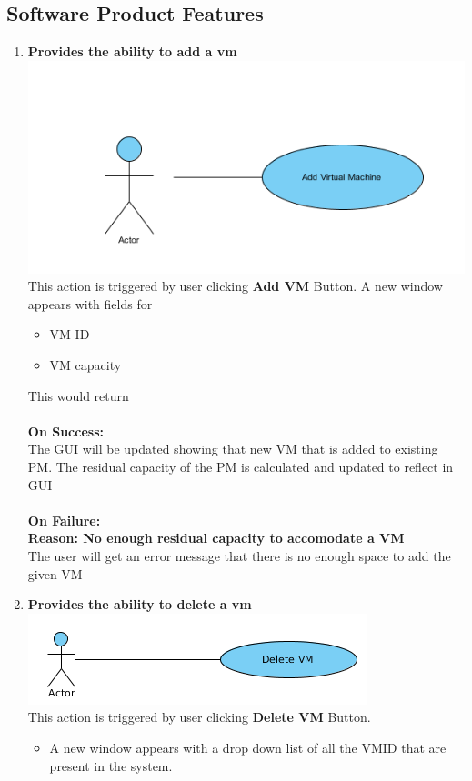 \documentclass[a4paper,11pt]{article}
\begin{document}
		\subsection{Software Product Features}
			\begin{enumerate}
				\item {\bf Provides the ability to add a vm} \\
 				\includegraphics{images/usecase}
				\\This action is triggered by user clicking {\bf Add VM } Button. A new window appears with fields for  
				\begin{itemize}
				 \item VM ID
				 \item VM capacity
				\end{itemize}
				
				This would return \\\\
				{\bf On Success: }\\
				The GUI will be updated showing that new  VM that is added to existing PM.
				The residual capacity of the PM is calculated and updated to reflect in GUI\\\\
				{\bf On Failure: } \\
				{\bf Reason: No enough residual capacity to accomodate a VM}\\
				The user will get an error message that there is no enough space to add the given VM\\
				
				\item {\bf Provides the ability to delete a vm}\\
				\includegraphics{images/delete}
				\\This action is triggered by user clicking {\bf Delete VM } Button. 
				\begin{itemize}
				 \item A new window appears with a drop down list of all the VM\textunderscore ID  that are 
				 present in the system.
				\end{itemize}
				

\end{enumerate}
\end{document}
